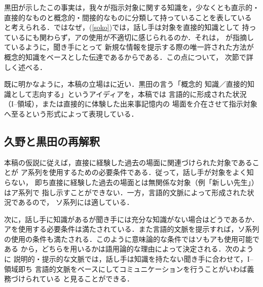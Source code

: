 黒田が示したこの事実は，我々が指示対象に関する知識を，少なくとも直示的・
直接的なものと概念的・間接的なものに分類して持っていることを表している
と考えられる．ではなぜ，(\ref{soko})では，話し手は対象を直接的知識として
持っているにも関わらず，アの使用が不適切に感じられるのか．それは，
が指摘しているように，聞き手にとって
新規な情報を提示する際の唯一許された方法が
概念的知識をベースとした伝達であるからである．この点について，
次節で詳しく述べる．

既に明かなように，本稿の立場はに近い．黒田の言う「概念的
知識／直接的知識として志向する」というアイディアを，本稿では
言語的に形成された状況（I--領域），または直接的に体験した出来事記憶内の
場面を介在させて指示対象へ至るという形式によって表現している．



\subsection{久野と黒田の再解釈}
本稿の仮説に従えば，直接に経験した過去の場面に関連づけられた対象であることが
ア系列を使用するための必要条件である．従って，話し手が対象をよく知らない，
即ち直接に経験した過去の場面とは無関係な対象（例「新しい先生」）はア系列で
指し示すことができない．一方，言語的文脈によって形成された状況であるので，
ソ系列には適している．


次に，話し手に知識があるが聞き手には充分な知識がない場合はどうであるか．
アを使用する必要条件は満たされている．また言語的文脈を提示すれば，ソ系列
の使用の条件も満たされる．このように意味論的な条件ではソもアも使用可能である
から，どちらを用いるかは語用論的な理由によって決定される．次のように
説明的・提示的な文脈では，話し手は知識を持たない聞き手に合わせて，I--領域即ち
言語的文脈をベースにしてコミュニケーションを行うことがいわば義務づけられている
と見ることができる．


